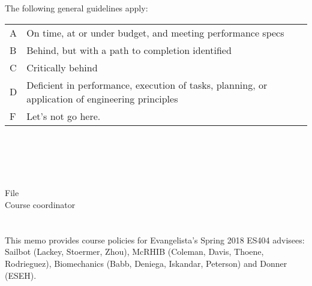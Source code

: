 \documentclass[10pt,courier]{navymemo}
\begin{document}
The following general guidelines apply: 
\begin{center}
\begin{tabular}{lp{5in}}
A & On time, at or under budget, and meeting performance specs \\
B & Behind, but with a path to completion identified \\
C & Critically behind \\
D & Deficient in performance, execution of tasks, planning, or application of engineering principles \\
F & Let's not go here. \\
\end{tabular}
\end{center}

\noclosing{}\\
\noindent\hspace*{4in}
\signature{D Evangelista}

\noindent\hspace*{4in}{235 Maury Hall}\\
\hspace*{4in}{(410) 293-6132}\\

\copyto{}
File\\
Course coordinator


\navyrecordnote
\thispagestyle{empty}

%

\navyrecordnotesubjline

\section{}  This memo provides course policies for Evangelista's Spring 2018 ES404 advisees: Sailbot (Lackey, Stoermer, Zhou), McRHIB (Coleman, Davis, Thoene, Rodrieguez), Biomechanics (Babb, Deniega, Iskandar, Peterson) and Donner (ESEH). 
\end{document}
